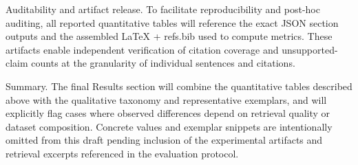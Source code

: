 Auditability and artifact release. To facilitate reproducibility and post-hoc auditing, all reported quantitative tables will reference the exact JSON section outputs and the assembled LaTeX + refs.bib used to compute metrics. These artifacts enable independent verification of citation coverage and unsupported-claim counts at the granularity of individual sentences and citations.

Summary. The final Results section will combine the quantitative tables described above with the qualitative taxonomy and representative exemplars, and will explicitly flag cases where observed differences depend on retrieval quality or dataset composition. Concrete values and exemplar snippets are intentionally omitted from this draft pending inclusion of the experimental artifacts and retrieval excerpts referenced in the evaluation protocol.